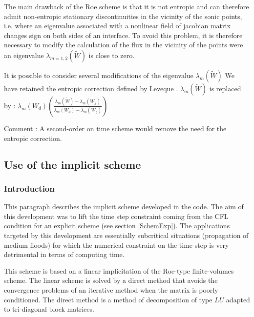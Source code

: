 The main drawback of the Roe scheme is that it is not entropic and can therefore admit non-entropic stationary discontinuities in the vicinity of the sonic points, i.e. where an eigenvalue associated with a nonlinear field of jacobian matrix changes sign on both sides of an interface. To avoid this problem, it is therefore necessary to modify the calculation of the flux in the vicinity of the points were an eigenvalue $\lambda_{m=1,2} (\tilde W )$ is close to zero.

It is possible to consider several modifications of the eigenvalue $\lambda_{m} (\tilde W )$ We have retained the entropic correction defined by Leveque \cite{LEVEQUE90}. $\lambda_{m} (\tilde W )$ is replaced by : $\lambda_m (W_d) \left ( \frac{\lambda_m (\tilde W) - \lambda_m (W_g)}{\lambda_m (W_d) - \lambda_m (W_g)}\right )$

\begin{CommentBlock}{Comment :}
A second-order on time scheme would remove the need for the entropic correction.
\end{CommentBlock}

\subsection{Use of the implicit scheme}

\subsubsection{Introduction}

This paragraph describes the implicit scheme developed in the \mascaret{} code. The aim of this development was to lift the time step constraint coming from the CFL condition for an explicit scheme (see section  \ref{SchemExp}). The applications targeted by this development are essentially subcritical situations (propagation of medium floods) for which the numerical constraint on the time step is very detrimental in terms of computing time.

This scheme is based on a linear implicitation of the Roe-type finite-volumes scheme. The linear scheme is solved by a direct method that avoids the convergence problems of an iterative method when the matrix is poorly conditioned. The direct method is a method of decomposition of type $LU$ adapted to tri-diagonal block matrices.

